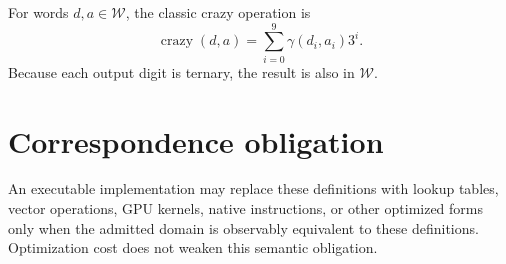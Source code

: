 \documentclass{article}
\begin{document}
For words $d,a\in\mathcal{W}$, the classic crazy operation is
\begin{equation}
  \operatorname{crazy}(d,a)
    = \sum_{i=0}^{9} \gamma(d_i,a_i)3^i.
  \label{eq:classic-crazy}
\end{equation}
Because each output digit is ternary, the result is also in $\mathcal{W}$.

\section{Correspondence obligation}

An executable implementation may replace these definitions with lookup tables,
vector operations, GPU kernels, native instructions, or other optimized forms
only when the admitted domain is observably equivalent to these definitions.
Optimization cost does not weaken this semantic obligation.
\end{document}
